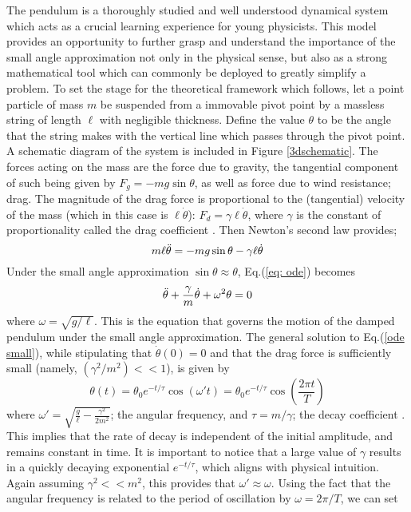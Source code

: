 The pendulum is a thoroughly studied and well understood dynamical system which acts as a crucial learning experience for young physicists. This model provides an opportunity to further grasp and understand the importance of the small angle approximation not only in the physical sense, but also as a strong mathematical tool which can commonly be deployed to greatly simplify a problem. To set the stage for the theoretical framework which follows, let a point particle of mass $m$ be suspended from a immovable pivot point by a massless string of length $\ell$ with negligible thickness. Define the value $\theta$ to be the angle that the string makes with the vertical line which passes through the pivot point. A schematic diagram of the system is included in Figure \ref{3dschematic}. The forces acting on the mass are the force due to gravity, the tangential component of such being given by $F_g = -mg\sin\theta$, as well as force due to wind resistance; drag. The magnitude of the drag force is proportional to the (tangential) velocity of the mass (which in this case is $\ell\Dot{\theta}$): $F_d = \gamma\ell\Dot{\theta}$, where $\gamma$ is the constant of proportionality called the drag coefficient \cite{drag}. Then Newton's second law provides;
\begin{equation} \label{eq: ode}
  m\ell\Ddot{\theta} = -mg\sin\theta - \gamma\ell\Dot{\theta}
\end{equation}
Under the small angle approximation $\sin\theta \approx \theta$, Eq.(\ref{eq: ode}) becomes
\begin{equation} \label{ode small}
  \Ddot{\theta} + \frac{\gamma}{m}\Dot{\theta} + \omega^2\theta = 0
\end{equation}
where $\omega = \sqrt{g/\ell}$. This is the equation that governs the motion of the damped pendulum under the small angle approximation. The general solution to Eq.(\ref{ode small}), while stipulating that $\Dot{\theta}(0) = 0$ and that the drag force is sufficiently small (namely, $(\gamma^2/m^2) << 1$), is given by
\begin{equation} \label{theta equation}
  \theta(t) = \theta_0 e^{-t/\tau}\cos\left(\omega't \right) =  \theta_0 e^{-t/\tau}\cos\left(\frac{2\pi t}{T} \right)
\end{equation}
where $\omega' = \sqrt{\frac{g}{\ell} - \frac{\gamma^2}{2m^2}}$; the angular frequency, and $\tau = m/\gamma$; the decay coefficient \cite{uoft}. This implies that the rate of decay is independent of the initial amplitude, and remains constant in time. It is important to notice that a large value of $\gamma$ results in a quickly decaying exponential $e^{-t/\tau}$, which aligns with physical intuition. Again assuming $\gamma^2 << m^2$, this provides that $\omega' \approx \omega$. Using the fact that the angular frequency is related to the period of oscillation by $\omega = 2\pi/T$, we can set 
